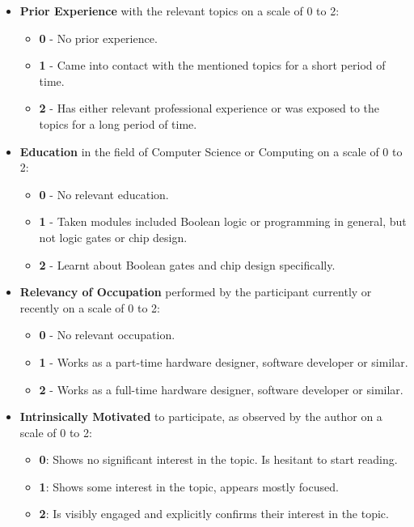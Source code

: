 \begin{itemize}
    \item \textbf{Prior Experience} with the relevant topics on a scale of 0 to 2:
        \begin{itemize}[]
            \item \textbf{0} - No prior experience.
            \item \textbf{1} - Came into contact with the mentioned topics for a short period of time.
            \item \textbf{2} - Has either relevant professional experience or was exposed to the topics for a long period of time.
        \end{itemize}
    \item \textbf{Education} in the field of Computer Science or Computing on a scale of 0 to 2:
    \begin{itemize}[]
        \item \textbf{0} - No relevant education.
        \item \textbf{1} - Taken modules included Boolean logic or programming in general, but not logic gates or chip design.
        \item \textbf{2} - Learnt about Boolean gates and chip design specifically.
    \end{itemize}
    \item \textbf{Relevancy of Occupation} performed by the participant currently or recently on a scale of 0 to 2:
    \begin{itemize}[]
        \item \textbf{0} - No relevant occupation.
        \item \textbf{1} - Works as a part-time hardware designer, software developer or similar.
        \item \textbf{2} - Works as a full-time hardware designer, software developer or similar.
    \end{itemize}
    \item \textbf{Intrinsically Motivated} to participate, as observed by the author on a scale of 0 to 2:
    \begin{itemize}[]
        \item \textbf{0}: Shows no significant interest in the topic. Is hesitant to start reading.
        \item \textbf{1}: Shows some interest in the topic, appears mostly focused.
        \item \textbf{2}: Is visibly engaged and explicitly confirms their interest in the topic.

\end{itemize}
\end{itemize}
